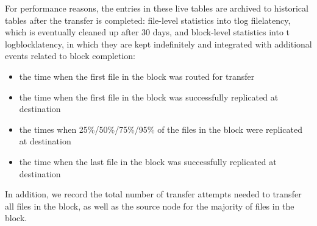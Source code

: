 For performance reasons, the entries in these live tables are archived
to historical tables after the transfer is completed: file-level
statistics into t\textunderscore log\textunderscore
file\textunderscore latency, which is eventually cleaned up after 30
days, and block-level statistics into t\textunderscore
log\textunderscore block\textunderscore latency, in which they are
kept indefinitely and integrated with additional events related to
block completion:
\begin{itemize}
\item the time when the first file in the block was routed for transfer
\item the time when the first file in the block was successfully
  replicated at destination
\item the times when 25\%/50\%/75\%/95\% of the files in the block
  were replicated at destination
\item the time when the last file in the block was successfully
  replicated at destination
\end{itemize}
In addition, we record the total number of transfer attempts needed to
transfer all files in the block, as well as the source node for the
majority of files in the block.
